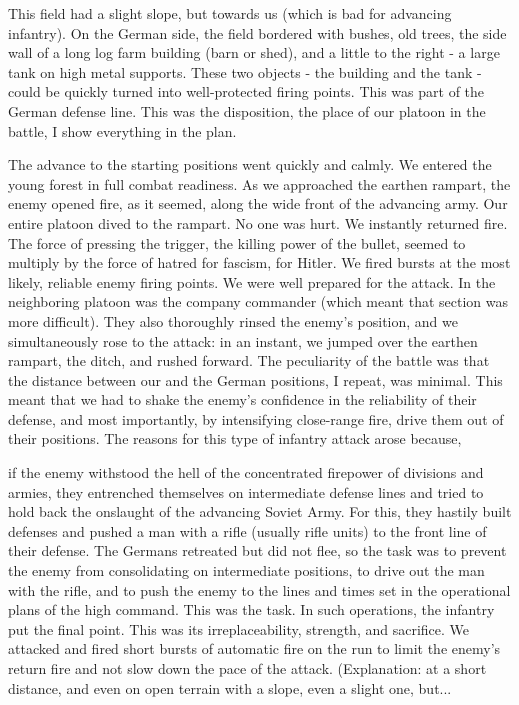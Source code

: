 \label{6-1}

This field had a slight slope, but towards us (which is bad for advancing infantry). On the German side, the field bordered with bushes, old trees, the side wall of a long log farm building (barn or shed), and a little to the right - a large tank on high metal supports. These two objects - the building and the tank - could be quickly turned into well-protected firing points. This was part of the German defense line. This was the disposition, the place of our platoon in the battle, I show everything in the plan.

\label{7-1}
The advance to the starting positions went quickly and calmly. We entered the young forest in full combat readiness. As we approached the earthen rampart, the enemy opened fire, as it seemed, along the wide front of the advancing army. Our entire platoon dived to the rampart. No one was hurt. We instantly returned fire. The force of pressing the trigger, the killing power of the bullet, seemed to multiply by the force of hatred for fascism, for Hitler. We fired bursts at the most likely, reliable enemy firing points. We were well prepared for the attack. In the neighboring platoon was the company commander (which meant that section was more difficult). They also thoroughly rinsed the enemy's position, and we simultaneously rose to the attack: in an instant, we jumped over the earthen rampart, the ditch, and rushed forward. The peculiarity of the battle was that the distance between our and the German positions, I repeat, was minimal. This meant that we had to shake the enemy's confidence in the reliability of their defense, and most importantly, by intensifying close-range fire, drive them out of their positions. The reasons for this type of infantry attack arose because,

\label{8-1}
if the enemy withstood the hell of the concentrated firepower of divisions and armies, they entrenched themselves on intermediate defense lines and tried to hold back the onslaught of the advancing Soviet Army. For this, they hastily built defenses and pushed a man with a rifle (usually rifle units) to the front line of their defense. The Germans retreated but did not flee, so the task was to prevent the enemy from consolidating on intermediate positions, to drive out the man with the rifle, and to push the enemy to the lines and times set in the operational plans of the high command. This was the task. In such operations, the infantry put the final point. This was its irreplaceability, strength, and sacrifice. We attacked and fired short bursts of automatic fire on the run to limit the enemy's return fire and not slow down the pace of the attack. (Explanation: at a short distance, and even on open terrain with a slope, even a slight one, but...

